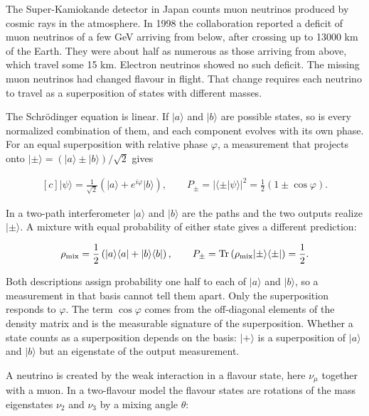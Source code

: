 \documentclass[11pt,oneside]{book}
\newenvironment{centeredalign}{\[\begin{gathered}[c]}{\end{gathered}\]}
\newcommand{\ket}[1]{\lvert #1\rangle}
\newcommand{\bra}[1]{\langle #1\rvert}
\begin{document}
\label{topic:quantum-superposition}

The Super-Kamiokande detector in Japan counts muon neutrinos produced by cosmic rays in the atmosphere. In 1998 the collaboration reported a deficit of muon neutrinos of a few GeV arriving from below, after crossing up to 13000 km of the Earth. They were about half as numerous as those arriving from above, which travel some 15 km. Electron neutrinos showed no such deficit. The missing muon neutrinos had changed flavour in flight. That change requires each neutrino to travel as a superposition of states with different masses.

The Schrödinger equation is linear. If \(\ket a\) and \(\ket b\) are possible states, so is every normalized combination of them, and each component evolves with its own phase. For an equal superposition with relative phase \(\varphi\), a measurement that projects onto \(\ket\pm=(\ket a\pm\ket b)/\sqrt2\) gives

\begin{centeredalign}
\ket\psi=\frac{1}{\sqrt2}\left(\ket a+e^{i\varphi}\ket b\right),\qquad
P_\pm=|\langle\pm|\psi\rangle|^2=\frac12\left(1\pm\cos\varphi\right).
\end{centeredalign}

In a two-path interferometer \(\ket a\) and \(\ket b\) are the paths and the two outputs realize \(\ket\pm\). A mixture with equal probability of either state gives a different prediction:

\begin{centeredalign}
\rho_{\rm mix}=\frac12\left(\ket a\bra a+\ket b\bra b\right),\qquad
P_\pm=\operatorname{Tr}\left(\rho_{\rm mix}\ket\pm\bra\pm\right)=\frac12.
\end{centeredalign}

Both descriptions assign probability one half to each of \(\ket a\) and \(\ket b\), so a measurement in that basis cannot tell them apart. Only the superposition responds to \(\varphi\). The term \(\cos\varphi\) comes from the off-diagonal elements of the density matrix and is the measurable signature of the superposition. Whether a state counts as a superposition depends on the basis: \(\ket+\) is a superposition of \(\ket a\) and \(\ket b\) but an eigenstate of the output measurement.

A neutrino is created by the weak interaction in a flavour state, here \(\nu_\mu\) together with a muon. In a two-flavour model the flavour states are rotations of the mass eigenstates \(\nu_2\) and \(\nu_3\) by a mixing angle \(\theta\):
\end{document}
